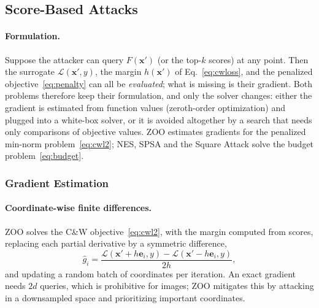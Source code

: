 \documentclass[10pt,a4paper]{extarticle}
\theoremstyle{definition}
\newcommand{\Loss}{\mathcal{L}}
\newcommand{\xadv}{\mathbf{x}'}
\begin{document}
\subsection{Score-Based Attacks}\label{sec:score}

\paragraph{Formulation.} Suppose the attacker can query \(F(\xadv)\) (or the top-\(k\) scores) at any point. Then the surrogate \(\Loss(\xadv,y)\), the margin \(h(\xadv)\) of Eq.~\eqref{eq:cwloss}, and the penalized objective~\eqref{eq:penalty} can all be \emph{evaluated}; what is missing is their gradient. Both problems therefore keep their formulation, and only the solver changes: either the gradient is estimated from function values (zeroth-order optimization) and plugged into a white-box solver, or it is avoided altogether by a search that needs only comparisons of objective values. ZOO estimates gradients for the penalized min-norm problem~\eqref{eq:cwl2}; NES, SPSA and the Square Attack solve the budget problem~\eqref{eq:budget}.

\subsubsection{Gradient Estimation}

\paragraph{Coordinate-wise finite differences.} ZOO \citep{chen2017zoo} solves the C\&W objective~\eqref{eq:cwl2}, with the margin computed from scores, replacing each partial derivative by a symmetric difference,
\[
\hat g_i = \frac{\Loss(\xadv+h\mathbf{e}_i,y)-\Loss(\xadv-h\mathbf{e}_i,y)}{2h},
\]
and updating a random batch of coordinates per iteration. An exact gradient needs \(2d\) queries, which is prohibitive for images; ZOO mitigates this by attacking in a downsampled space and prioritizing important coordinates.
\end{document}
